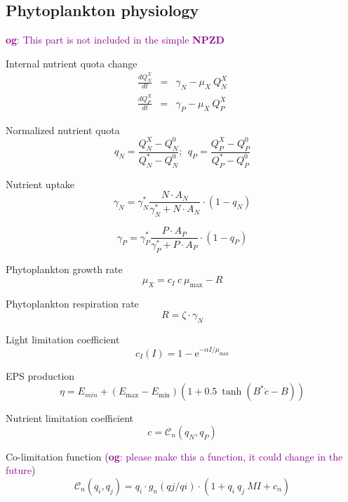 \documentclass[fleqn]{article}                     %
\newcommand{\comment}[3][darkmagenta]{\textcolor{#1}{\textbf{#2}: #3}}
\begin{document}
\subsection{Phytoplankton physiology}
\comment{og}{This part is not included in the simple \textbf{NPZD}}

Internal nutrient quota change
\begin{eqnarray}
  \frac{dQ^X_N}{dt} &=&  \gamma_N - \mu_X \  Q^X_N \\
  \frac{dQ^X_P}{dt} &=&  \gamma_P- \mu_X \  Q^X_P
\end{eqnarray}

Normalized nutrient quota
\begin{equation}
  q_N = \frac{Q^X_N-Q^0_N}{Q^*_N-Q^0_N};\ \ q_P = \frac{Q^X_P-Q^0_P}{Q^*_P-Q^0_P}
\end{equation}

Nutrient uptake
\begin{equation}
  \gamma_N = \gamma^*_N \frac{N \cdot A_N}{\gamma^*_N+ N \cdot A_N} \cdot (1-q_N)
\end{equation}

\begin{equation}
  \gamma_P = \gamma^*_P \frac{P \cdot A_P}{\gamma^*_P + P \cdot A_P} \cdot (1-q_P)
\end{equation}

Phytoplankton growth rate
\begin{equation}
  \mu_X= c_I\  c\  \mu_{\text{max}} - R
\end{equation}

Phytoplankton respiration rate
\begin{equation}
  R = \zeta \cdot \gamma_N
\end{equation}

Light limitation coefficient
\begin{equation}
  c_I(I) = 1-\textrm{e}^{-\alpha I/ \mu_{\text{max}}}
\end{equation}

EPS production
\begin{equation}
  \eta = E_{min} + (E_{\textrm{max}}-E_{\textrm{min}})(1+0.5\ \tanh(B^*\dot{c}-B))
\end{equation}

Nutrient limitation coefficient
\begin{equation}
  c = \mathcal{C}_n(q_N,q_P)
\end{equation}

Co-limitation function (\comment{og}{please make this a function, it could change in the future})
\begin{equation}
  \mathcal{C}_n(q_i, q_j) = q_i \cdot g_n(qj/qi) \cdot (1 + q_i\ q_j\ MI + c_n)
\end{equation}
\end{document}
